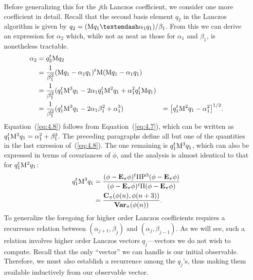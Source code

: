 Before generalizing this for the $j$th Lanczos coefficient, we consider one more coeﬂicient
in detail. Recall that the second basis element $q_2$ in the Lanczos algorithm is given by 
$q_2 = (\M q_1 — \alpha_1 q_1)/\beta_1$. 
From this we can derive an expression for $\alpha_2$ which, while not as neat as those
%
%
%
%
for $\alpha_1$ and $\beta_1$, is nonetheless tractable.
\begin{align}
\label{eq:4.8}
\alpha_2 &= q_2^t \mathrm{M} q_2 \nonumber\\
&= \frac{1}{\beta_1^2}(\mathrm{M} q_1 - \alpha_1 q_1)^t\mathrm{M} (\mathrm{M} q_1 - \alpha_1 q_1)\nonumber\\
&= \frac{1}{\beta_1^2}(q_1^t\mathrm{M}^3 q_1 - 2\alpha_1 q_1^t\mathrm{M}^2 q_1 + \alpha_1^2q_1^t\mathrm{M} q_1 )\nonumber\\
&= \frac{1}{\beta_1^2}(q_1^t\mathrm{M}^3 q_1 - 2\alpha_1 \beta_1^2 + \alpha_1^3 )
&= \bigl[q_1^t\mathrm{M}^2 q_1 - \alpha^2_1\bigr]^{1/2}.
\end{align}
Equation~(\ref{eq:4.8}) follows from Equation~(\ref{eq:4.7}), which can be
written as $q_1^t\mathrm{M}^2 q_1 = \alpha_1^2 + \beta_1^2$.  
The preceding paragraphs define all but one of the quantities in the last
exression of~(\ref{eq:4.8}). The one remaining
is $q_1^t\mathrm{M}^3 q_1$, which can also be expressed in terms of covariances of $\phi$,
and the analysis is almost identical to that for $q_1^t\mathrm{M}^2q_1$:
\begin{align*}
q_1^t\mathrm{M}^3 q_1  &= \frac{(\phi - \mathbf{E}_\pi\phi)^t\Pi \mathrm{P}^3(\phi- \mathbf{E}_\pi \phi)}
{(\phi - \mathbf{E}_\pi\phi)^t\Pi (\phi- \mathbf{E}_\pi \phi)} \\
&= \frac{\mathbf{C}_\pi (\phi(n), \phi(n + 3))}{\mathbf{Var}_\pi(\phi(n))}.
\end{align*}
To generalize the foregoing for higher order Lanczos coeﬂicients requires a recurrence
relation between $(\alpha_{j+1}, \beta_j)$ and $(\alpha_{j}, \beta_{j-1})$. 
As we will see, such a relation involves higher order
Lanczos vectors $q_j$---vectors we do not wish to compute. Recall that the only ``vector'' we can
handle is our initial observable. Therefore, we must also establish a recurrence
among the $q_j$'s, thus making them available inductively from our observable vector.

